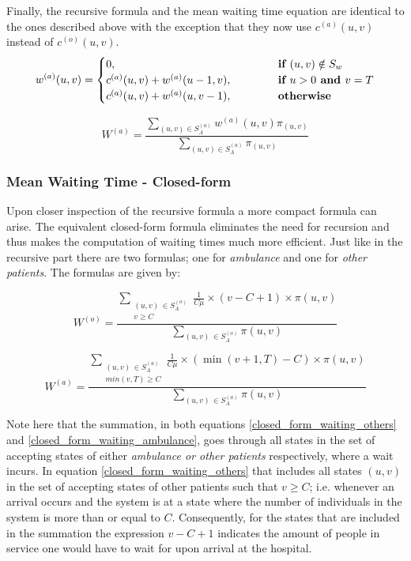 Finally, the recursive formula and the mean waiting time equation are identical to the ones described above with the exception that they now use \(c^{(a)}(u,v)\) instead of \(c^{(o)}(u,v)\).
\begin{equation}
    w^{(a)}(u,v) = 
    \begin{cases} 
        0, \hspace{4.85cm} & \textbf{if } (u,v) \notin S_w \\
        c^{(a)}(u,v) + w^{(a)}(u-1, v), & \textbf{if } u > 0 \textbf{ and } v = T \\
        c^{(a)}(u,v) + w^{(a)}(u, v-1), & \textbf{otherwise}
    \end{cases}
\end{equation}

\begin{equation}
    W^{(a)} = \frac{\sum_{(u,v) \in S_A^{(a)}} w^{(a)}(u,v) \pi_{(u,v)}}{\sum_{(u,v) \in S_A^{(a)}} \pi_{(u,v)}}
\end{equation}

\subsubsection{Mean Waiting Time - Closed-form}
Upon closer inspection of the recursive formula a more compact formula can arise. The equivalent closed-form formula eliminates the need for recursion and thus makes the computation of waiting times much more efficient. Just like in the recursive part there are two formulas; one for \textit{ambulance} and one for \textit{other patients}. The formulas are given by:

\begin{equation} \label{closed_form_waiting_others}
    W^{(o)} = \frac{\sum_{\substack{(u,v) \, \in S_A^{(o)} \\ v \geq C}} \frac{1}{C \mu} \times (v-C+1) \times \pi(u,v)}{\sum_{(u,v) \, \in S_A^{(o)}} \pi(u,v)}
\end{equation}
    
\begin{equation}\label{closed_form_waiting_ambulance}
    W^{(a)} = \frac{\sum_{\substack{(u,v) \, \in S_A^{(a)} \\ min(v,T) \geq C}} \frac{1}{C \mu} \times (\min(v+1,T)-C) \times \pi(u,v)}{\sum_{(u,v) \, \in S_A^{(a)}} \pi(u,v)}
\end{equation}

Note here that the summation, in both equations \ref{closed_form_waiting_others} and \ref{closed_form_waiting_ambulance}, goes through all states in the set of accepting states of either \textit{ambulance or other patients} respectively, where a wait incurs. In equation \ref{closed_form_waiting_others} that includes all states \((u,v)\) in the set of accepting states of other patients such that \( v \geq C\); i.e. whenever an arrival occurs and the system is at a state where the number of individuals in the system is more than or equal to $C$. Consequently, for the states that are included in the summation  the expression \( v-C+1 \) indicates the amount of people in service one would have to wait for upon arrival at the hospital.

